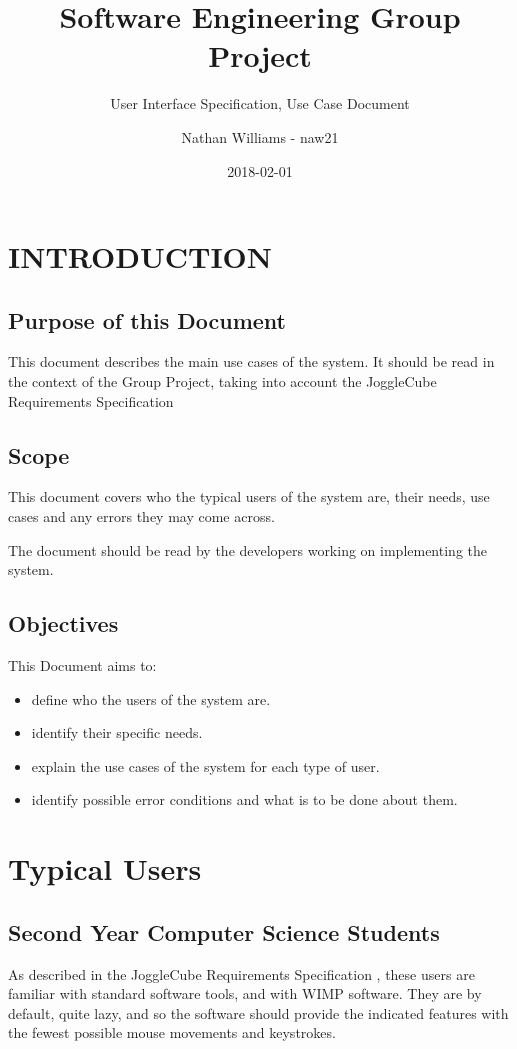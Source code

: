 \documentclass{project}
\begin{document}
\title{Software Engineering Group Project}
\subtitle{User Interface Specification, Use Case Document}
\author{Nathan Williams - naw21}     
\date{2018-02-01}
\maketitle
\tableofcontents
\newpage
\section{INTRODUCTION}

\subsection{Purpose of this Document}

This document describes the main use cases of the system. It should be read in the context of the Group Project, taking into account the JoggleCube Requirements Specification \cite{SE.QA.CSRS}

\subsection{Scope}

This document covers who the typical users of the system are, their needs, use cases and any errors they may come across.

The document should be read by the developers working on implementing the system.

\subsection{Objectives}
This Document aims to:
\begin{itemize}
	\item define who the users of the system are.
	\item identify their specific needs.
	\item explain the use cases of the system for each type of user.
	\item identify possible error conditions and what is to be done about them.
\end{itemize}

\section{Typical Users}
\subsection{Second Year Computer Science Students}
	As described in the JoggleCube Requirements Specification \cite{SE.QA.CSRS}, these users are familiar with standard software tools, and with WIMP software. They are by default, quite lazy, and so the software should provide the indicated features with the fewest possible mouse movements and keystrokes.
\end{document}
